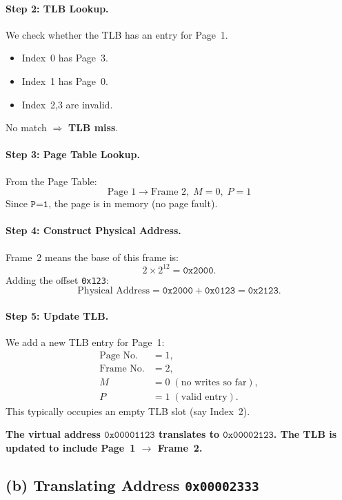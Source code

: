 \documentclass{article}
\begin{document}
\paragraph{Step 2: TLB Lookup.}
We check whether the TLB has an entry for Page~1.
\begin{itemize}
  \item Index~0 has Page~3.
  \item Index~1 has Page~0.
  \item Index~2,3 are invalid.
\end{itemize}
No match $\Rightarrow$ \textbf{TLB miss}.

\paragraph{Step 3: Page Table Lookup.}
From the Page Table:
\[
\text{Page~1} \longrightarrow \text{Frame~2}, \; M=0, \; P=1
\]
Since \(\texttt{P=1}\), the page is in memory (no page fault).

\paragraph{Step 4: Construct Physical Address.}
Frame~2 means the base of this frame is:
\[
2 \times 2^{12} = \texttt{0x2000}.
\]
Adding the offset \texttt{0x123}:
\[
\text{Physical Address} = \texttt{0x2000} + \texttt{0x0123} = \texttt{0x2123}.
\]

\paragraph{Step 5: Update TLB.}
We add a new TLB entry for Page~1:
\[
\begin{aligned}
  \text{Page No.} &= 1, \\
  \text{Frame No.} &= 2, \\
  M &= 0 \; (\text{no writes so far}), \\
  P &= 1 \; (\text{valid entry}).
\end{aligned}
\]
This typically occupies an empty TLB slot (say Index~2). 

\textbf{The virtual address \(\texttt{0x00001123}\) translates to \(\texttt{0x00002123}\). The TLB is updated to include Page~1 $\to$ Frame~2.}

\newpage




\subsection*{(b) Translating Address \texttt{0x00002333}}
\end{document}
